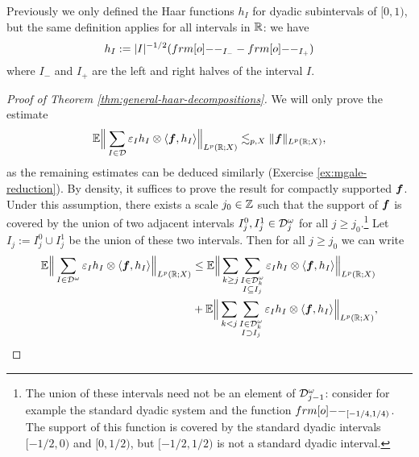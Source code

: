 \begin{rmk}
  Previously we only defined the Haar functions $h_{I}$ for dyadic subintervals of $[0,1)$, but the same definition applies for all intervals in $\mathbb{R}$:
  we have
  \begin{equation*}
    h_{I} := |I|^{-1/2}(\1_{I_{-}} - \1_{I_{+}})
  \end{equation*}
  where $I_{-}$ and $I_{+}$ are the left and right halves of the interval $I$.
\end{rmk}

\begin{proof}[Proof of Theorem \ref{thm:general-haar-decompositions}]
  We will only prove the estimate
  \begin{equation*}
    \mathbb{E} \Big\| \sum_{I \in \mathcal{D}} \varepsilon_{I} h_{I} \otimes \langle \bm{f}, h_{I} \rangle \Big\|_{L^p(\mathbb{R};X)} \lesssim_{p,X}     \|\bm{f}\|_{L^p(\mathbb{R};X)},
  \end{equation*}
  as the remaining estimates can be deduced similarly (Exercise \ref{ex:mgale-reduction}).
  By density, it suffices to prove the result for compactly supported $\bm{f}$.
  Under this assumption, there exists a scale $j_{0} \in \mathbb{Z}$ such that the support of $\bm{f}$ is covered by the union of two adjacent intervals $I_{j}^{0}, I_{j}^{1} \in \mathcal{D}^{\omega}_{j}$ for all $j \geq j_{0}$.\footnote{The union of these intervals need not be an element of $\mathcal{D}^{\omega}_{j-1}$: consider for example the standard dyadic system and the function $\1_{[-1/4,1/4)}$.
    The support of this function is covered by the standard dyadic intervals $[-1/2,0)$ and $[0,1/2)$, but $[-1/2,1/2)$ is not a standard dyadic interval.}
  Let $I_{j} := I_{j}^{0} \cup I_{j}^{1}$ be the union of these two intervals.
  Then for all $j \geq j_{0}$ we can write
  \begin{equation*}
    \begin{aligned}
      \E \Big\| \sum_{I \in \mc{D}^{\omega}} \varepsilon_{I} h_{I} \otimes \langle \mb{f}, h_{I} \rangle \Big\|_{L^p(\R;X)}
      &\leq \E \Big\| \sum_{k \geq j} \sum_{\substack{I \in \mc{D}_{k}^{\omega} \\ I \subseteq I_{j}}} \varepsilon_{I} h_{I} \otimes \langle \mb{f}, h_{I} \rangle \Big\|_{L^p(\R;X)} \\
      &+ \E \Big\| \sum_{k < j} \sum_{\substack{I \in \mc{D}_{k}^{\omega} \\ I \supset I_{j}}} \varepsilon_{I} h_{I} \otimes \langle \mb{f}, h_{I} \rangle \Big\|_{L^p(\R;X)},

\end{aligned}
\end{equation*}
\end{proof}

